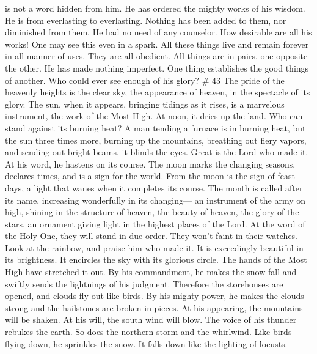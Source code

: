 is not a word hidden from him.  He has ordered the mighty
works of his wisdom. He is from everlasting to everlasting. Nothing has
been added to them, nor diminished from them. He had no need of any
counselor.  How desirable are all his works! One may see
this even in a spark.  All these things live and remain
forever in all manner of uses. They are all obedient. 
All things are in pairs, one opposite the other. He has made nothing
imperfect.  One thing establishes the good things of
another. Who could ever see enough of his glory? \# 43 
The pride of the heavenly heights is the clear sky, the appearance of
heaven, in the spectacle of its glory.  The sun, when it
appears, bringing tidings as it rises, is a marvelous instrument, the
work of the Most High.  At noon, it dries up the land. Who
can stand against its burning heat?  A man tending a
furnace is in burning heat, but the sun three times more, burning up the
mountains, breathing out fiery vapors, and sending out bright beams, it
blinds the eyes.  Great is the Lord who made it. At his
word, he hastens on its course.  The moon marks the
changing seasons, declares times, and is a sign for the world.
 From the moon is the sign of feast days, a light that
wanes when it completes its course.  The month is called
after its name, increasing wonderfully in its changing--- an instrument
of the army on high, shining in the structure of heaven, 
the beauty of heaven, the glory of the stars, an ornament giving light
in the highest places of the Lord.  At the word of the
Holy One, they will stand in due order. They won't faint in their
watches.  Look at the rainbow, and praise him who made
it. It is exceedingly beautiful in its brightness.  It
encircles the sky with its glorious circle. The hands of the Most High
have stretched it out.  By his commandment, he makes the
snow fall and swiftly sends the lightnings of his judgment.
 Therefore the storehouses are opened, and clouds fly out
like birds.  By his mighty power, he makes the clouds
strong and the hailstones are broken in pieces.  At his
appearing, the mountains will be shaken. At his will, the south wind
will blow.  The voice of his thunder rebukes the earth.
So does the northern storm and the whirlwind. Like birds flying down, he
sprinkles the snow. It falls down like the lighting of locusts.
